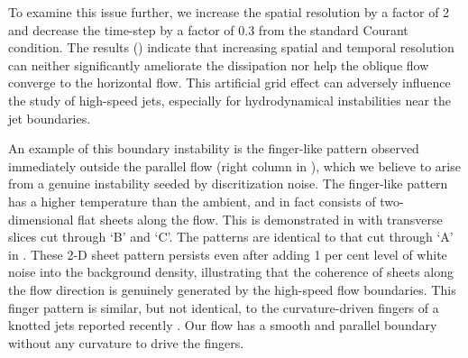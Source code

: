 To examine this issue further, we increase the spatial resolution by a factor of 2 and decrease the time-step by a factor of 0.3 from the standard Courant condition. The results () indicate that increasing spatial and temporal resolution can neither significantly ameliorate the dissipation nor help the oblique flow converge to the horizontal flow. This artificial grid effect can adversely influence the study of high-speed jets, especially for hydrodynamical instabilities near the jet boundaries.

An example of this boundary instability is the finger-like pattern observed immediately outside the parallel flow (right column in ), which we believe to arise from a genuine instability seeded by discritization noise. The finger-like pattern has a higher temperature than the ambient, and in fact consists of two-dimensional flat sheets along the flow. This is demonstrated in  with transverse slices cut through `B' and `C'. The patterns are identical to that cut through `A' in . These 2-D sheet pattern persists even after adding 1 per cent level of white noise into the background density, illustrating that the coherence of sheets along the flow direction is genuinely generated by the high-speed flow boundaries. This finger pattern is similar, but not identical, to the curvature-driven fingers of a knotted jets reported recently \citep{Gourgouliatos2017}. Our flow has a smooth and parallel boundary without any curvature to drive the fingers.

